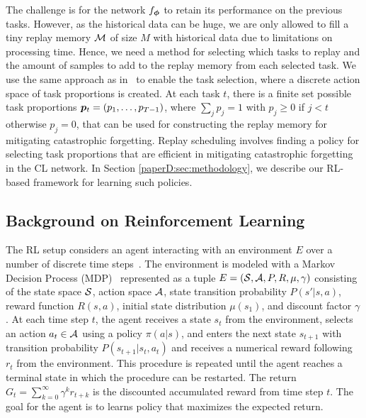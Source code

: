 The challenge is for the network $f_{{\bm{\phi}}}$ to retain its performance on the previous tasks. However, as the historical data can be huge, we are only allowed to fill a tiny replay memory ${\mathcal{M}}$ of size $M$ with historical data due to limitations on processing time. Hence, we need a method for selecting which tasks to replay and the amount of samples to add to the replay memory from each selected task. We use the same approach as in~ to enable the task selection, 
where a discrete action space of task proportions is created. At each task $t$, there is a finite set possible task proportions ${\bm{p}}_t = (p_1, \dots, p_{T-1})$, where $\sum_j p_j = 1$ with $p_j \geq 0$ if $j < t$ otherwise $p_j = 0$, that can be used for constructing the replay memory for mitigating catastrophic forgetting. 
Replay scheduling involves finding a policy for selecting task proportions that are efficient in mitigating catastrophic forgetting in the CL network. In Section \ref{paperD:sec:methodology}, we describe our RL-based framework for learning such policies. 


\subsection{Background on Reinforcement Learning}

The RL setup considers an agent interacting with an environment $E$ over a number of discrete time steps~. The environment is modeled with a Markov Decision Process (MDP)~ represented as a tuple $E = ({\mathcal{S}}, {\mathcal{A}}, P, R, \mu, \gamma)$ consisting of the state space ${\mathcal{S}}$, action space ${\mathcal{A}}$, state transition probability $P(s' | s, a)$, reward function $R(s, a)$, initial state distribution $\mu(s_1)$, and discount factor $\gamma$. At each time step $t$, the agent receives a state $s_t$ from the environment, selects an action $a_t \in {\mathcal{A}}$ using a policy $\pi(a | s)$, and enters the next state $s_{t+1}$ with transition probability $P(s_{t+1} | s_t, a_t)$ and receives a numerical reward following $r_t$ from the environment. This procedure is repeated until the agent reaches a terminal state in which the procedure can be restarted. The return $G_t = \sum_{k=0}^{\infty} \gamma^{k} r_{t+k}$ is the discounted accumulated reward from time step $t$. The goal for the agent is to learns  policy that maximizes the expected return.


